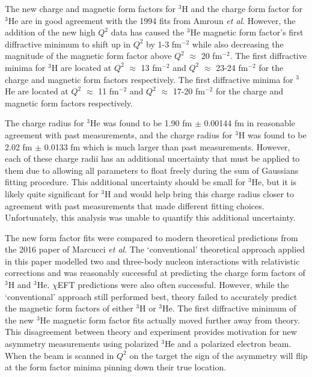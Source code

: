 \documentclass[../main.tex]{subfiles}
\begin{document}
\begin{singlespace}
{{}

{\parindent0pt %

\indent The new charge and magnetic form factors for $^3$H and the charge form factor for $^3$He are in good agreement with the 1994 fits from Amroun \textit{et al}. However, the addition of the new high $Q^2$ data has caused the $^3$He magnetic form factor's first diffractive minimum to shift up in $Q^2$ by 1-3 fm$^{-2}$ while also decreasing the magnitude of the magnetic form factor above $Q^2$ $\approx$ 20 fm$^{-2}$. The first diffractive minima for $^3$H are located at $Q^2$ $\approx$ 13 fm$^{-2}$ and $Q^2$ $\approx$ 23-24 fm$^{-2}$ for the charge and magnetic form factors respectively. The first diffractive minima for $^3$He are located at $Q^2$ $\approx$ 11 fm$^{-2}$ and $Q^2$ $\approx$ 17-20 fm$^{-2}$ for the charge and magnetic form factors respectively. \\

}

{\parindent0pt %

\indent The charge radius for $^3$He was found to be 1.90 fm $\pm$ 0.00144 fm in reasonable agreement with past measurements, and the charge radius for $^3$H was found to be 2.02 fm $\pm$ 0.0133 fm which is much larger than past measurements. However, each of these charge radii has an additional uncertainty that must be applied to them due to allowing all parameters to float freely during the sum of Gaussians fitting procedure. This additional uncertainty should be small for $^3$He, but it is likely quite significant for $^3$H and would help bring this charge radius closer to agreement with past measurements that made different fitting choices. Unfortunately, this analysis was unable to quantify this additional uncertainty. \\

}

{\parindent0pt %

\indent The new form factor fits were compared to modern theoretical predictions from the 2016 paper of Marcucci \textit{et al}. The `conventional' theoretical approach applied in this paper modelled two and three-body nucleon interactions with relativistic corrections and was reasonably successful at predicting the charge form factors of $^3$H and $^3$He. $\chi$EFT predictions were also often successful. However, while the `conventional' approach still performed best, theory failed to accurately predict the magnetic form factors of either $^3$H or $^3$He. The first diffractive minimum of the new $^3$He magnetic form factor fits actually moved further away from theory. This disagreement between theory and experiment provides motivation for new asymmetry measurements using polarized $^3$He and a polarized electron beam. When the beam is scanned in $Q^2$ on the target the sign of the asymmetry will flip at the form factor minima pinning down their true location.

}

}
\end{singlespace}
\end{document}
